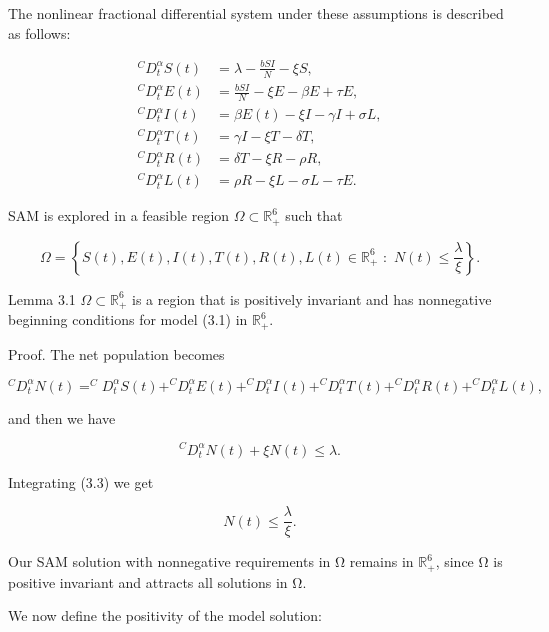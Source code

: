 \documentclass[10pt]{NSP1}
\begin{document}
The nonlinear fractional differential system under these assumptions is described as follows:

\[
\begin{matrix}
^{C}D_{t}^{\alpha}S(t) & = \lambda - \frac{bSI}{N} - \xi S, \\
^{C}D_{t}^{\alpha}E(t) & = \frac{bSI}{N} - \xi E - \beta E + \tau E, \\
^{C}D_{t}^{\alpha}I(t) & = \beta E(t) - \xi I - \gamma I + \sigma L, \\
^{C}D_{t}^{\alpha}T(t) & = \gamma I - \xi T - \delta T, \\
^{C}D_{t}^{\alpha}R(t) & = \delta T - \xi R - \rho R, \\
^{C}D_{t}^{\alpha}L(t) & = \rho R - \xi L - \sigma L - \tau E.
\end{matrix}
\]

\par\medskip{}\smallskip

\par\medskip{}\smallskip

SAM is explored in a feasible region \(\Omega \subset \mathbb{R}_{+}^{6}\) such that

\[
\Omega = \left\{ S(t),E(t),I(t),T(t),R(t),L(t) \in \mathbb{R}_{+}^{6}\mspace{6mu}:\mspace{6mu} N(t) \leq \frac{\lambda}{\xi} \right\}.
\]

Lemma 3.1 \(\Omega \subset \mathbb{R}_{+}^{6}\) is a region that is positively invariant and has nonnegative beginning conditions for model (3.1) in \(\mathbb{R}_{+}^{6}\).

Proof. The net population becomes

\[
^{C}D_{t}^{\alpha}N(t) =^{C}D_{t}^{\alpha}S(t) +^{C}D_{t}^{\alpha}E(t) +^{C}D_{t}^{\alpha}I(t) +^{C}D_{t}^{\alpha}T(t) +^{C}D_{t}^{\alpha}R(t) +^{C}D_{t}^{\alpha}L(t),
\]

and then we have

\[
^{C}D_{t}^{\alpha}N(t) + \xi N(t) \leq \lambda.
\]

Integrating (3.3) we get

\[
N(t) \leq \frac{\lambda}{\xi}.
\]

Our SAM solution with nonnegative requirements in Ω remains in \(\mathbb{R}_{+}^{6}\), since Ω is positive invariant and attracts all solutions in Ω.

We now define the positivity of the model solution:
\end{document}
